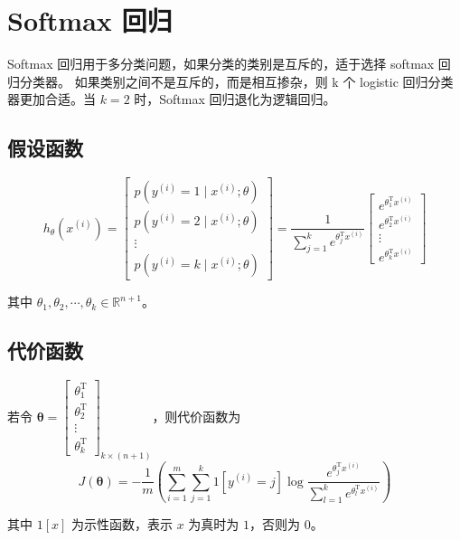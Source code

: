 \section{Softmax 回归}

Softmax 回归用于多分类问题，如果分类的类别是互斥的，适于选择 softmax 回归分类器。
如果类别之间不是互斥的，而是相互掺杂，则 k 个 logistic 回归分类器更加合适。当 $k = 2$ 时，Softmax 回归退化为逻辑回归。

\subsection{假设函数}
\begin{equation}
    h_\theta\left(x^{(i)}\right) = 
\begin{bmatrix}
p(y^{(i)}=1 \mid x^{(i)};\theta) \\
p(y^{(i)}=2 \mid x^{(i)};\theta) \\
\vdots \\
p(y^{(i)}=k \mid x^{(i)};\theta)
\end{bmatrix}
= \dfrac{1}{\sum_{j=1}^k e^{\theta_j^\mathrm Tx^{(i)}}}
\begin{bmatrix}
e^{\theta_1^\mathrm Tx^{(i)}} \\
e^{\theta_2^\mathrm Tx^{(i)}} \\
\vdots \\
e^{\theta_k^\mathrm Tx^{(i)}}
\end{bmatrix}
\end{equation}

其中 $\theta_1, \theta_2, \cdots, \theta_k \in \mathbb{R}^{n+1}$。

\subsection{代价函数}
若令 $\boldsymbol{\theta} =
\begin{bmatrix}
\theta_1^\mathrm T \\
\theta_2^\mathrm T \\
\vdots \\
\theta_k^\mathrm T
\end{bmatrix}_{k \times (n + 1)}$，则代价函数为
\begin{equation}
    J(\boldsymbol{\theta}) = -\dfrac 1m \left(\sum_{i=1}^m\sum_{j=1}^k1\left[y^{(i)} = j\right]\log 
    \dfrac{e^{\theta_j^\mathrm Tx^{(i)}}}{\sum_{l=1}^k e^{\theta_l^\mathrm Tx^{(i)}}}\right)
\end{equation}

其中 $1[x]$ 为示性函数，表示 $x$ 为真时为 $1$，否则为 $0$。

